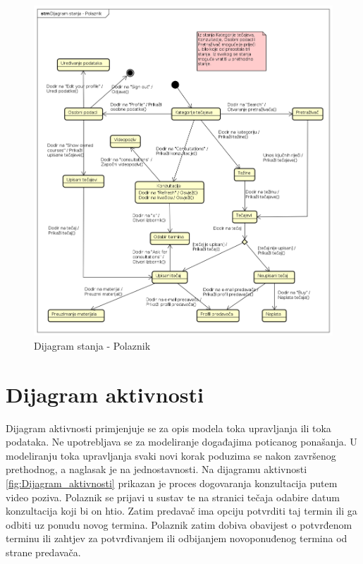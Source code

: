 			\begin{figure}[h]
				\includegraphics[scale=0.5]{dijagrami/Dijagram_stanja.PNG}
				\centering
				\caption{Dijagram stanja - Polaznik}
				\label{fig:Dijagram_stanja}
			\end{figure}
		
		
			\eject 
		
		\section{Dijagram aktivnosti}
			
			\text Dijagram aktivnosti primjenjuje se za opis modela toka upravljanja ili toka podataka. Ne upotrebljava se za modeliranje događajima poticanog ponašanja. U modeliranju toka upravljanja svaki novi korak poduzima se nakon završenog prethodnog, a naglasak je na jednostavnosti. Na dijagramu aktivnosti \ref{fig:Dijagram_aktivnosti} prikazan je proces dogovaranja konzultacija putem video poziva. Polaznik se prijavi u sustav te na stranici tečaja odabire datum konzultacija koji bi on htio. Zatim predavač ima opciju potvrditi taj termin ili ga odbiti uz ponudu novog termina. Polaznik zatim dobiva obavijest o potvrđenom terminu ili zahtjev za potvrđivanjem ili odbijanjem novoponuđenog termina od strane predavača.
			\eject
			
